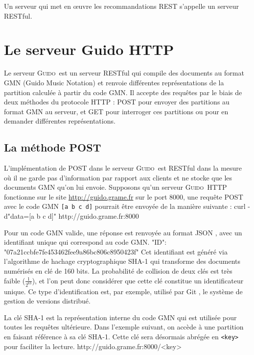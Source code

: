 \documentclass{article}
\newenvironment{code}		{\vspace{-2mm} \fontsize{8.5pt}{12pt}\selectfont \verbatim}{\endverbatim\vspace{-2mm}}
\newenvironment{mcode}		{\vspace{-2mm} \fontsize{10pt}{12pt}\selectfont \verbatim}{\endverbatim\vspace{-2mm}}
\newcommand{\icode}[1]		{{\small \texttt{#1}}}
\newcommand{\guido}		{\textsc{Guido}}
\begin{document}
Un serveur qui met en \oe{}uvre les recommandations REST s'appelle un serveur RESTful.

\section{Le serveur Guido HTTP}\label{section:overview}

Le serveur \guido\ est un serveur RESTful qui compile des documents au format GMN (Guido Music Notation) et renvoie différentes représentations de la partition calculée à partir du code GMN. Il accepte des requêtes par le biais de deux méthodes du protocole HTTP : POST pour envoyer des partitions au format GMN au serveur, et GET pour interroger ces partitions ou pour en demander différentes représentations.

\subsection{La méthode POST}\label{subsection:post}
L'implémentation de POST dans le serveur \guido\ est RESTful dans la mesure où il ne garde pas d'information par rapport aux clients et ne stocke que les documents GMN qu'on lui envoie.
Supposons qu'un serveur \guido\ HTTP fonctionne sur le site \url{http://guido.grame.fr} sur le port 8000, une requête POST avec le code GMN \verb=[a b c d]= pourrait être envoyée de la manière suivante :
\begin{code}
curl -d"data=[a b c d]" http://guido.grame.fr:8000
\end{code}

Pour un code GMN valide, une réponse est renvoyée au format JSON \cite{json}, avec un identifiant unique qui correspond au code GMN.
\begin{code}
{
  "ID": "07a21ccbfe7fe453462fee9a86bc806c8950423f"
}
\end{code}
Cet identifiant est généré via l'algorithme de hachage cryptographique SHA-1 \cite{sha1} qui transforme des documents numérisés en clé de 160 bits. La probabilité de collision de deux clés est très faible ($\frac{1}{2^{63}}$), et l'on peut donc considérer que cette clé constitue un identificateur unique. Ce type d'identification est, par exemple, utilisé par Git \cite{scott2009pro}, le système de gestion de versions distribué.

La clé SHA-1 est la représentation interne du code GMN qui est utilisée pour toutes les requêtes ultérieure. Dans l'exemple suivant, on accède à une partition en faisant référence à sa clé SHA-1. Cette clé sera désormais abrégée en \icode{<key>} pour faciliter la lecture.
\begin{mcode}
  http://guido.grame.fr:8000/<key>
\end{mcode}
\end{document}
